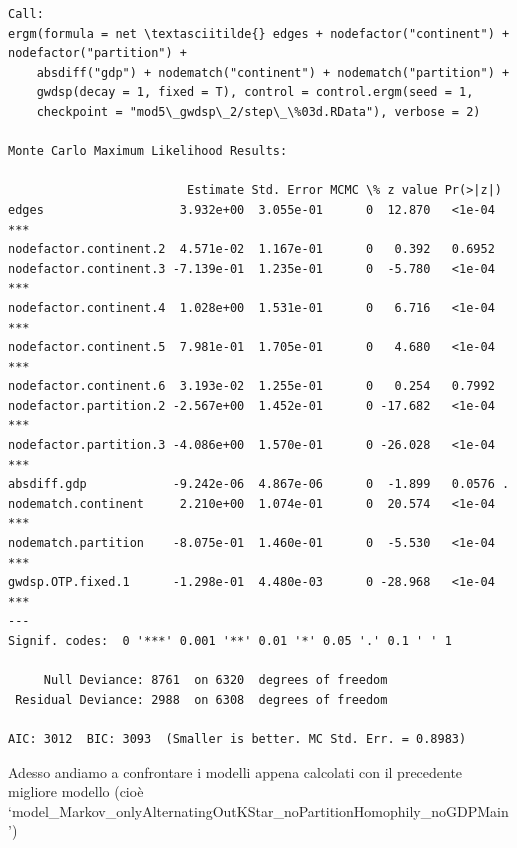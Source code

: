\documentclass[11pt]{article}
\begin{document}
    
    \begin{Verbatim}[commandchars=\\\{\}]
Call:
ergm(formula = net \textasciitilde{} edges + nodefactor("continent") + nodefactor("partition") + 
    absdiff("gdp") + nodematch("continent") + nodematch("partition") + 
    gwdsp(decay = 1, fixed = T), control = control.ergm(seed = 1, 
    checkpoint = "mod5\_gwdsp\_2/step\_\%03d.RData"), verbose = 2)

Monte Carlo Maximum Likelihood Results:

                         Estimate Std. Error MCMC \% z value Pr(>|z|)    
edges                   3.932e+00  3.055e-01      0  12.870   <1e-04 ***
nodefactor.continent.2  4.571e-02  1.167e-01      0   0.392   0.6952    
nodefactor.continent.3 -7.139e-01  1.235e-01      0  -5.780   <1e-04 ***
nodefactor.continent.4  1.028e+00  1.531e-01      0   6.716   <1e-04 ***
nodefactor.continent.5  7.981e-01  1.705e-01      0   4.680   <1e-04 ***
nodefactor.continent.6  3.193e-02  1.255e-01      0   0.254   0.7992    
nodefactor.partition.2 -2.567e+00  1.452e-01      0 -17.682   <1e-04 ***
nodefactor.partition.3 -4.086e+00  1.570e-01      0 -26.028   <1e-04 ***
absdiff.gdp            -9.242e-06  4.867e-06      0  -1.899   0.0576 .  
nodematch.continent     2.210e+00  1.074e-01      0  20.574   <1e-04 ***
nodematch.partition    -8.075e-01  1.460e-01      0  -5.530   <1e-04 ***
gwdsp.OTP.fixed.1      -1.298e-01  4.480e-03      0 -28.968   <1e-04 ***
---
Signif. codes:  0 '***' 0.001 '**' 0.01 '*' 0.05 '.' 0.1 ' ' 1

     Null Deviance: 8761  on 6320  degrees of freedom
 Residual Deviance: 2988  on 6308  degrees of freedom
 
AIC: 3012  BIC: 3093  (Smaller is better. MC Std. Err. = 0.8983)
    \end{Verbatim}

    
    Adesso andiamo a confrontare i modelli appena calcolati con il
precedente migliore modello (cioè
`model\_Markov\_onlyAlternatingOutKStar\_noPartitionHomophily\_noGDPMain')
\end{document}
